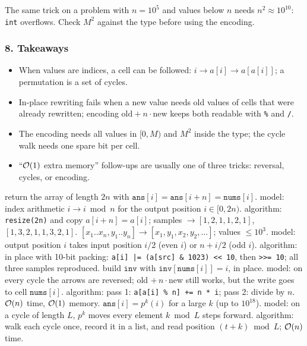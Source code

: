 \begin{warningbox}
The same trick on a problem with $n = 10^5$ and values below $n$ needs $n^2 \approx 10^{10}$: \texttt{int} overflows. Check $M^2$ against the type before using the encoding.
\end{warningbox}

\subsubsection*{8. Takeaways}

\begin{itemize}[leftmargin=*]
    \item When values are indices, a cell can be followed: $i \to a[i] \to a[a[i]]$; a permutation is a set of cycles.
    \item In-place rewriting fails when a new value needs old values of cells that were already rewritten; encoding $\text{old} + n\cdot\text{new}$ keeps both readable with \texttt{\%} and \texttt{/}.
    \item The encoding needs all values in $[0, M)$ and $M^2$ inside the type; the cycle walk needs one spare bit per cell.
    \item ``$\mathcal{O}(1)$ extra memory'' follow-ups are usually one of three tricks: reversal, cycles, or encoding.
\end{itemize}

\begin{variantsbox}
  {return the array of length $2n$ with $\texttt{ans}[i] = \texttt{ans}[i+n] = \texttt{nums}[i]$.}
  {model: index arithmetic $i \to i \bmod n$ for the output position $i \in [0, 2n)$.}
  {algorithm: \texttt{resize(2n)} and copy $a[i+n] = a[i]$; samples $\to [1,2,1,1,2,1]$, $[1,3,2,1,1,3,2,1]$.}
  {$[x_1..x_n, y_1..y_n] \to [x_1, y_1, x_2, y_2, \ldots]$; values $\le 10^3$.}
  {model: output position $i$ takes input position $i/2$ (even $i$) or $n + i/2$ (odd $i$).}
  {algorithm: in place with 10-bit packing: \texttt{a[i] |= (a[src] \& 1023) << 10}, then \texttt{>>= 10}; all three samples reproduced.}
  {build $\texttt{inv}$ with $\texttt{inv}[\texttt{nums}[i]] = i$, in place.}
  {model: on every cycle the arrows are reversed; old $+\,n\cdot$new still works, but the write goes to cell $\texttt{nums}[i]$.}
  {algorithm: pass 1: \texttt{a[a[i] \% n] += n * i}; pass 2: divide by $n$. $\mathcal{O}(n)$ time, $\mathcal{O}(1)$ memory.}
  {$\texttt{ans}[i] = p^k(i)$ for a large $k$ (up to $10^{18}$).}
  {model: on a cycle of length $L$, $p^k$ moves every element $k \bmod L$ steps forward.}
  {algorithm: walk each cycle once, record it in a list, and read position $(t + k) \bmod L$; $\mathcal{O}(n)$ time.}
\end{variantsbox}
